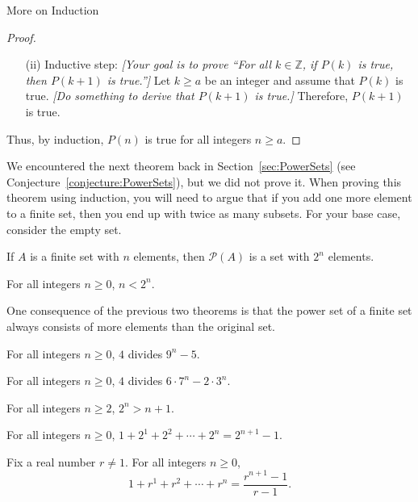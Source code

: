 \begin{section}{More on Induction}
\begin{skeleton}
\begin{center}
{\begin{minipage}{6in}
\begin{proof}
\begin{enumerate}
\item[(ii)] Inductive step:  \emph{[Your goal is to prove ``For all $k\in\mathbb{Z}$, if $P(k)$ is true, then $P(k+1)$ is true.'']} Let $k \ge a$ be an integer and assume that $P(k)$ is true. \emph{[Do something to derive that $P(k+1)$ is true.]} Therefore, $P(k+1)$ is true.
\end{enumerate}
Thus, by induction, $P(n)$ is true for all integers $n \ge a$.
\end{proof}
\end{minipage}
}
\end{center}
\end{skeleton}

We encountered the next theorem back in Section~\ref{sec:PowerSets} (see Conjecture~\ref{conjecture:PowerSets}), but we did not prove it. When proving this theorem using induction, you will need to argue that if you add one more element to a finite set, then you end up with twice as many subsets. For your base case, consider the empty set.

\begin{theorem}\label{thm:size of power set for finite sets}
If $A$ is a finite set with $n$ elements, then $\mathcal{P}(A)$ is a set with $2^{n}$ elements.
\end{theorem}

\begin{theorem}\label{thm:n<2^n}
For all integers $n \ge 0$, $n<2^n$.
\end{theorem}

One consequence of the previous two theorems is that the power set of a finite set always consists of more elements than the original set.

\begin{theorem}
For all integers $n \ge 0$, $4$ divides $9^n - 5$.
\end{theorem}

\begin{theorem}
For all integers $n \ge 0$, $4$ divides $6\cdot 7^n - 2 \cdot 3^n$.
\end{theorem}

\begin{theorem}
For all integers $n \ge 2$, $2^n > n + 1$.
\end{theorem}

\begin{theorem}
For all integers $n \ge 0$, $1 + 2^1 + 2^2 + \cdots + 2^n = 2^{n+1} - 1$.
\end{theorem}

\begin{theorem}
Fix a real number $r \neq 1$. For all integers $n \ge 0$,
$$\displaystyle{1 + r^1 + r^2 + \cdots + r^n = \frac{r^{n+1} - 1}{r-1}}.$$
\end{theorem}


\end{section}
